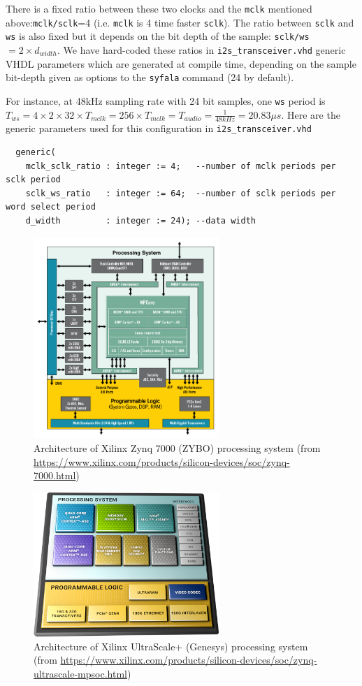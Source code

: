 \documentclass[11pt]{article}
\numberwithin{equation}{section}
\numberwithin{figure}{section}
\begin{document}
There is a fixed ratio between these two clocks and the {\tt mclk} mentioned above:{\tt mclk/sclk}=4 (i.e. {\tt mclk} is 4 time faster {\tt sclk}). The ratio between {\tt sclk} and {\tt ws} is also fixed but it depends on the bit depth of the sample: {\tt sclk/ws}$=2\times d_{width}$. We have hard-coded these ratios  in {\tt i2s\_transceiver.vhd} generic VHDL parameters which are generated at compile time, depending on the sample bit-depth given as options to the {\tt syfala} command (24 by default).

For instance, at  48kHz sampling rate with 24 bit samples,  one {\tt ws} period is $T_{ws}=4\times 2\times 32\times T_{mclk}=256\times T_{mclk}=T_{audio}=\frac{1}{48kHz}=20.83\mu s$. Here are the generic parameters used for this configuration in {\tt i2s\_transceiver.vhd}

{\small
\begin{verbatim}
  generic(
    mclk_sclk_ratio : integer := 4;   --number of mclk periods per sclk period
    sclk_ws_ratio   : integer := 64;  --number of sclk periods per word select period
    d_width         : integer := 24); --data width
\end{verbatim}
}


\begin{figure}[ht]
  \centerline{\includegraphics[width=7cm]{zynq-mp-core-dual1.png}}
  \caption{Architecture of Xilinx Zynq 7000 (ZYBO) processing system (from \url{https://www.xilinx.com/products/silicon-devices/soc/zynq-7000.html})}
  \label{zynq}
\end{figure}

\begin{figure}[ht]
  \centerline{\includegraphics[width=7cm]{fig/ultrascale_MPSOC.png}}
  \caption{Architecture of Xilinx UltraScale+ (Genesys) processing system (from \url{https://www.xilinx.com/products/silicon-devices/soc/zynq-ultrascale-mpsoc.html})}
  \label{ultrascale}
\end{figure}
\end{document}

